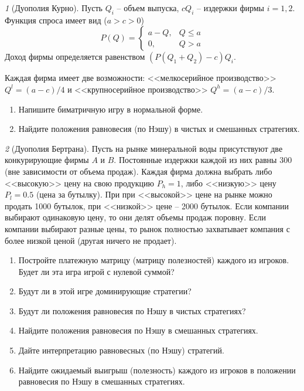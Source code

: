 \documentclass[12pt]{article}
\theoremstyle{remark}
\newtheorem{exercise}{}[subsection]
\begin{document}
\begin{exercise}[Дуополия Курно]
Пусть $Q_i$ -- объем выпуска, $cQ_i$ --
издержки фирмы $i=1,2$. Функция спроса имеет вид ($a>c>0$)
\[
	P(Q)=\begin{cases}
	a-Q, & Q\leq a \\
	0, & Q>a
	\end{cases}
\]
Доход фирмы определяется равенством $(P(Q_1+Q_2)-c)Q_i$.

Каждая фирма имеет две возможности: <<мелкосерийное производство>>
$Q^l=(a-c)/4$ и <<крупносерийное производство>> $Q^h=(a-c)/3$.
\begin{enumerate}
	\item Напишите биматричную игру в нормальной форме.
	\item Найдите положения равновесия (по Нэшу) в чистых и смешанных
	стратегиях.
\end{enumerate}
\end{exercise}

\begin{exercise}[Дуополия Бертрана]
Пусть на рынке минеральной воды присутствуют две конкурирующие фирмы $A$ и $B$. 
Постоянные издержки каждой из них равны 300
(вне зависимости от объема продаж). Каждая фирма
должна выбрать либо <<высокую>> цену на свою продукцию $P_h=1$, 
либо <<низкую>> цену $P_l=0.5$ (цена за бутылку). При при <<высокой>> цене на 
рынке можно продать 1000 бутылок, при <<низкой>> цене -- 2000 бутылок.
Если компании выбирают одинаковую цену, то они делят объемы продаж поровну.
Если компании выбирают разные цены, то рынок полностью захватывает компания
с более низкой ценой (другая ничего не продает).
\begin{enumerate}
	\item Постройте платежную матрицу (матрицу полезностей) каждого из игроков. 
	Будет ли эта игра игрой с нулевой суммой? %
	\item Будут ли в этой игре доминирующие стратегии? %
	\item Будут ли положения равновесия по Нэшу в чистых стратегиях? %
	\item Найдите положения равновесия по Нэшу в смешанных стратегиях.
	\item Дайте интерпретацию равновесных (по Нэшу) стратегий.
	\item Найдите ожидаемый выигрыш (полезность) каждого из игроков
	в положении равновесия по Нэшу в смешанных стратегиях.
\end{enumerate}
\end{exercise}
\end{document}
